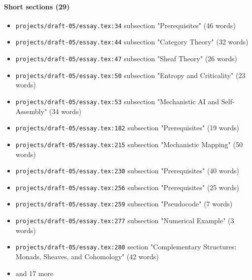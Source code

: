 \documentclass[11pt]{article}
\newcommand{\loc}[1]{{\small\color{muted}\texttt{#1}}}
\begin{document}
\paragraph{Short sections (29)}
\begin{itemize}
\item \loc{projects/\allowbreak{}draft-05/\allowbreak{}essay.tex:34} subsection "Prerequisites" (46 words)
\item \loc{projects/\allowbreak{}draft-05/\allowbreak{}essay.tex:44} subsection "Category Theory" (32 words)
\item \loc{projects/\allowbreak{}draft-05/\allowbreak{}essay.tex:47} subsection "Sheaf Theory" (26 words)
\item \loc{projects/\allowbreak{}draft-05/\allowbreak{}essay.tex:50} subsection "Entropy and Criticality" (23 words)
\item \loc{projects/\allowbreak{}draft-05/\allowbreak{}essay.tex:53} subsection "Mechanistic AI and Self-Assembly" (34 words)
\item \loc{projects/\allowbreak{}draft-05/\allowbreak{}essay.tex:182} subsection "Prerequisites" (19 words)
\item \loc{projects/\allowbreak{}draft-05/\allowbreak{}essay.tex:215} subsection "Mechanistic Mapping" (50 words)
\item \loc{projects/\allowbreak{}draft-05/\allowbreak{}essay.tex:230} subsection "Prerequisites" (40 words)
\item \loc{projects/\allowbreak{}draft-05/\allowbreak{}essay.tex:256} subsection "Prerequisites" (25 words)
\item \loc{projects/\allowbreak{}draft-05/\allowbreak{}essay.tex:259} subsection "Pseudocode" (7 words)
\item \loc{projects/\allowbreak{}draft-05/\allowbreak{}essay.tex:277} subsection "Numerical Example" (3 words)
\item \loc{projects/\allowbreak{}draft-05/\allowbreak{}essay.tex:280} section "Complementary Structures: Monads, Sheaves, and Cohomology" (42 words)
\item[] {\color{muted}\small and 17 more}
\end{itemize}
\end{document}
